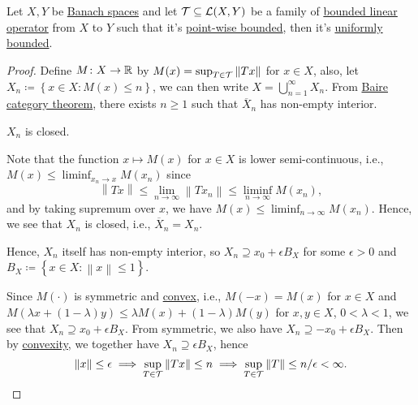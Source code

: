\begin{theorem}\label{thm:uniform-boundedness}
	Let \(X, Y\) be \hyperref[def:Banach-space]{Banach spaces} and let \(\mathcal{\MakeUppercase{T}} \subseteq \mathcal{\MakeUppercase{l}} (X, Y)\) be a family of \hyperref[def:bounded-linear-op]{bounded linear operator} from \(X\) to \(Y\) such that it's \hyperref[def:point-wise-bounded]{point-wise bounded}, then it's \hyperref[def:uniformly-bounded]{uniformly bounded}.
\end{theorem}
\begin{proof}
	Define \(M\colon X\to \mathbb{\MakeUppercase{r}} \) by \(M(x) = \sup _{T\in \mathcal{\MakeUppercase{t}} }\left\lVert Tx\right\rVert \) for \(x\in X\), also, let \(X_n \coloneqq \left\{ x\in X\colon M(x) \leq n \right\}\), we can then write \(X = \bigcup_{n=1}^{\infty} X_n\). From \hyperref[prop:Baire-category]{Baire category theorem}, there exists \(n \geq 1\) such that \(\overline{X} _n\) has non-empty interior.
	\begin{claim}
		\(X_n\) is closed.
	\end{claim}
	\begin{explanation}
		Note that the function \(x \mapsto M(x)\) for \(x\in X\) is lower semi-continuous, i.e., \(M(x) \leq \liminf_{x_n \to x} M(x_n)\) since
		\[
			\left\lVert Tx\right\rVert \leq \lim\limits_{n \to \infty} \left\lVert Tx_n\right\rVert \leq \liminf_{n \to \infty} M(x_n),
		\]
		and by taking supremum over \(x\), we have \(M(x) \leq \liminf_{n \to \infty} M(x_n)\). Hence, we see that \(X_n\) is closed, i.e., \(\overline{X} _n = X_n\).
	\end{explanation}

	Hence, \(X_n\) itself has non-empty interior, so \(X_n \supseteq x_{0} + \epsilon B_X\) for some \(\epsilon > 0\) and \(B_X\coloneqq \left\{ x\in X\colon \left\lVert x\right\rVert \leq 1 \right\} \).

	Since \(M(\cdot)\) is symmetric and \hyperref[def:convex-function]{convex}, i.e., \(M(-x) = M(x)\) for \(x\in X\) and \(M(\lambda x + (1 - \lambda )y) \leq \lambda M(x) + (1 - \lambda )M(y)\) for \(x, y\in X\), \(0 < \lambda < 1\), we see that \(X_n \supseteq x_0 + \epsilon B_X\). From symmetric, we also have \(X_n \supseteq -x_0 + \epsilon B_X\). Then by \hyperref[def:convex-function]{convexity}, we together have \(X_n \supseteq \epsilon B_X\), hence
	\[
		\left\lVert x\right\rVert \leq \epsilon \implies \sup _{T\in \mathcal{\MakeUppercase{t}} } \left\lVert Tx\right\rVert \leq n\implies \sup _{T\in \mathcal{\MakeUppercase{t}} } \left\lVert T\right\rVert \leq n / \epsilon  < \infty.
	\]
\end{proof}


